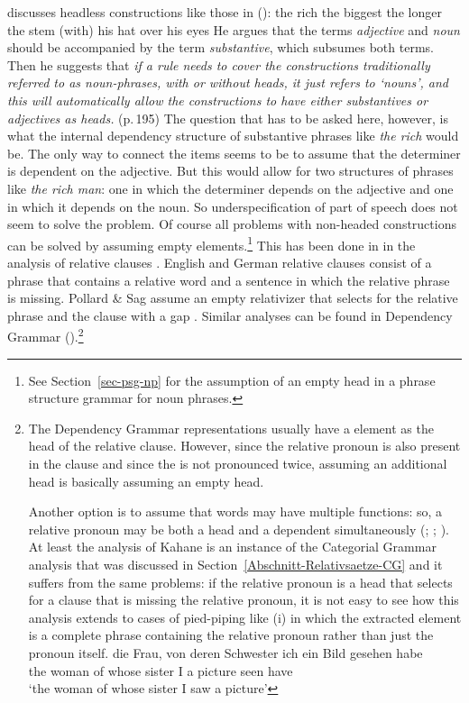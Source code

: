 \citet[Section~4.E]{Hudson80a} discusses headless constructions like those in ():
\eal
\ex the rich
\ex the biggest
\ex the longer the stem
\ex (with) his hat over his eyes
\zl
He argues that the terms \emph{adjective} and \emph{noun} should be accompanied by the term
\emph{substantive}, which subsumes both terms. Then he suggests that \emph{if a rule needs to cover
  the constructions traditionally referred to as noun-phrases, with or without heads, it just
  refers to `nouns', and this will automatically allow the constructions to have either
substantives or adjectives as heads.} (p.\,195) The question that has to be asked here, however, is
what the internal dependency structure of substantive phrases like \emph{the rich} would be. The
only way to connect the items seems to be to assume that the determiner is dependent on the
adjective. But this would allow for two structures of phrases like \emph{the rich man}: one in which
the determiner depends on the adjective and one in which it depends on the noun. So
underspecification of part of speech does not seem to solve the problem. Of course all problems with
non-headed constructions can be solved by assuming empty elements.\footnote{%
 See Section~\ref{sec-psg-np} for the assumption of an empty head in a phrase structure grammar for
 noun phrases.}
This has been done in \hpsg in the analysis of relative clauses \citep[Chapter~5]{ps2}. English and German relative clauses consist of a
phrase that contains a relative word and a sentence in which the relative phrase is missing. Pollard
\& Sag assume an empty relativizer that selects for the relative phrase and the clause with a
gap \citep[--217]{ps2}. Similar analyses can be found in Dependency Grammar (\citealp[]{Eroms2000a}).\footnote{
  The Dependency Grammar representations usually have a  element as the head of the relative
  clause. However, since the relative pronoun is also present in the clause and since the 
  is not pronounced twice, assuming an additional  head is basically assuming an empty
  head. 

  Another option is to assume that words may have multiple functions: so, a relative pronoun may be
  both a head and a dependent simultaneously (\citealp[Chapter 246, §8--11]{Tesniere2015a-not-crossreferenced}; \citealp[\page xlvi]{OK2015a}; \citealp[--130]{Kahane2009a}). At least the analysis of Kahane is an instance of the Categorial
  Grammar analysis that was discussed in Section~\ref{Abschnitt-Relativsaetze-CG} and it suffers from the same problems: if the
  relative pronoun is a head that selects for a clause that is missing the relative pronoun, it is not easy to see how
  this analysis extends to cases of pied-piping like (i) in which the extracted element is a complete phrase
  containing the relative pronoun rather than just the pronoun itself.
\ea
\gll die Frau, von deren Schwester ich ein Bild gesehen habe\\
     the woman of whose sister I a picture seen have\\
\glt `the woman of whose sister I saw a picture'
\zlast
}
